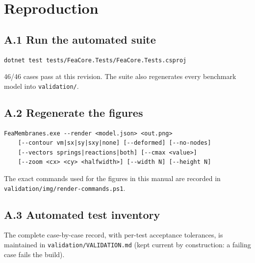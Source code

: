 \documentclass[11pt,a4paper]{report}
\begin{document}
\appendix
\chapter{Reproduction}

\section*{A.1 Run the automated suite}
\begin{verbatim}
dotnet test tests/FeaCore.Tests/FeaCore.Tests.csproj
\end{verbatim}
46/46 cases pass at this revision. The suite also regenerates every benchmark
model into \texttt{validation/}.

\section*{A.2 Regenerate the figures}
\begin{verbatim}
FeaMembranes.exe --render <model.json> <out.png>
    [--contour vm|sx|sy|sxy|none] [--deformed] [--no-nodes]
    [--vectors springs|reactions|both] [--cmax <value>]
    [--zoom <cx> <cy> <halfwidth>] [--width N] [--height N]
\end{verbatim}
The exact commands used for the figures in this manual are recorded in
\texttt{validation/img/render-commands.ps1}.

\section*{A.3 Automated test inventory}
The complete case-by-case record, with per-test acceptance tolerances, is
maintained in \texttt{validation/VALIDATION.md} (kept current by construction:
a failing case fails the build).
\end{document}
